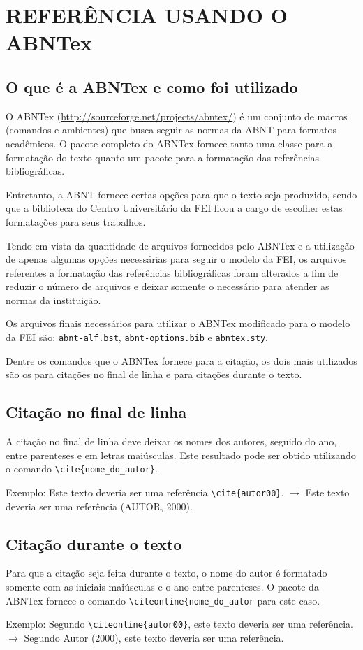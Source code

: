 \chapter{REFERÊNCIA USANDO O ABNTex}\label{chap:referencia}

    \section{O que é a ABNTex e como foi utilizado}

    O ABNTex (\href{http://sourceforge.net/projects/abntex/}{http://sourceforge.net/projects/abntex/}) é um conjunto de macros (comandos e ambientes) que busca seguir as normas da ABNT para formatos acadêmicos. O pacote completo do ABNTex fornece tanto uma classe para a formatação do texto quanto um pacote para a formatação das referências bibliográficas.

    Entretanto, a ABNT fornece certas opções para que o texto seja produzido, sendo que a biblioteca do Centro Universitário da FEI ficou a cargo de escolher estas formatações para seus trabalhos.

    Tendo em vista da quantidade de arquivos fornecidos pelo ABNTex e a utilização de apenas algumas opções necessárias para seguir o modelo da FEI, os arquivos referentes a formatação das referências bibliográficas foram alterados a fim de reduzir o número de arquivos e deixar somente o necessário para atender as normas da instituição.

    Os arquivos finais necessários para utilizar o ABNTex modificado para o modelo da FEI são: \texttt{abnt-alf.bst}, \texttt{abnt-options.bib} e \texttt{abntex.sty}.

    Dentre os comandos que o ABNTex fornece para a citação, os dois mais utilizados são os para citações no final de linha e para citações durante o texto.

    \section{Citação no final de linha}
    A citação no final de linha deve deixar os nomes dos autores, seguido do ano, entre parenteses e em letras maiúsculas. Este resultado pode ser obtido utilizando o comando \verb+\cite{nome_do_autor}+.

    Exemplo: Este texto deveria ser uma referência \verb+\cite{autor00}+. $\to$ Este texto deveria ser uma referência (AUTOR, 2000).

    \section{Citação durante o texto}
    Para que a citação seja feita durante o texto, o nome do autor é formatado somente com as iniciais maiúsculas e o ano entre parenteses. O pacote da ABNTex fornece o comando \verb+\citeonline{nome_do_autor+ para este caso.

    Exemplo: Segundo \verb+\citeonline{autor00}+, este texto deveria ser uma referência. $\to$ Segundo Autor (2000), este texto deveria ser uma referência.
